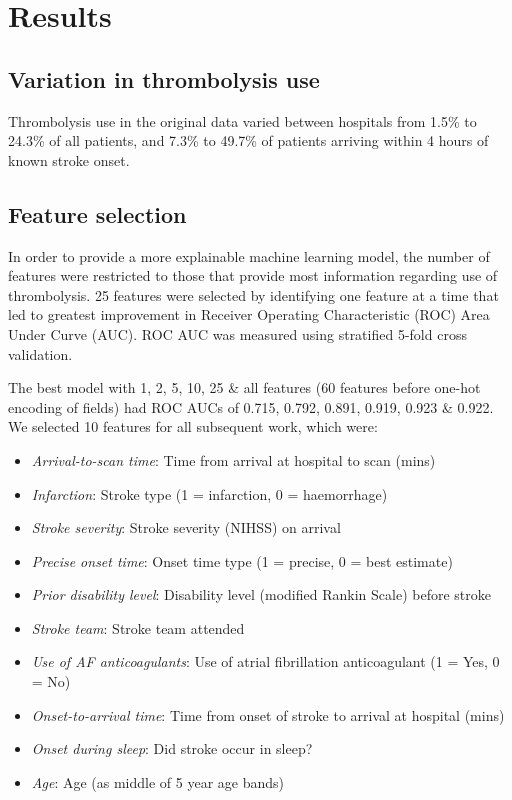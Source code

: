 \section{Results}

\subsection{Variation in thrombolysis use}

Thrombolysis use in the original data varied between hospitals from 1.5\% to 24.3\% of all patients, and 7.3\% to 49.7\% of patients arriving within 4 hours of known stroke onset.


\subsection{Feature selection}

In order to provide a more explainable machine learning model, the number of features were restricted to those that provide most information regarding use of thrombolysis. 25 features were selected by identifying one feature at a time that led to greatest improvement in Receiver Operating Characteristic (ROC) Area Under Curve (AUC). ROC AUC was measured using stratified 5-fold cross validation.

The best model with 1, 2, 5, 10, 25 \& all features (60 features before one-hot encoding of fields) had ROC AUCs of 0.715, 0.792, 0.891, 0.919, 0.923 \& 0.922. We selected 10 features for all subsequent work, which were:

\begin{itemize}
    \item \emph{Arrival-to-scan time}: Time from arrival at hospital to scan (mins)
    \item \emph{Infarction}: Stroke type (1 = infarction, 0 = haemorrhage)
    \item \emph{Stroke severity}: Stroke severity (NIHSS) on arrival
    \item \emph{Precise onset time}: Onset time type (1 = precise, 0 = best estimate)
    \item \emph{Prior disability level}: Disability level (modified Rankin Scale) before stroke
    \item \emph{Stroke team}: Stroke team attended
    \item \emph{Use of AF anticoagulants}: Use of atrial fibrillation anticoagulant (1 = Yes, 0 = No)
    \item \emph{Onset-to-arrival time}: Time from onset of stroke to arrival at hospital (mins)
    \item \emph{Onset during sleep}: Did stroke occur in sleep?
    \item \emph{Age}: Age (as middle of 5 year age bands)
\end{itemize}

